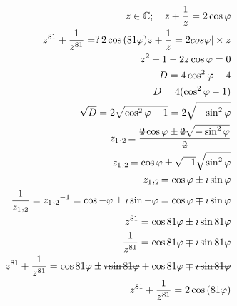 \documentclass{article}
\newcommand{\stkout}[1]{\ifmmode\text{\sout{\ensuremath{#1}}}\else\sout{#1}\fi}
\begin{document}
    \begin{align*}
        z \in \mathbb{C};\quad z + \frac{1}{z} = 2\cos\varphi\\
        z ^ {81} + \frac{1}{z ^ {81}} =?\, 2\cos{(81\varphi)}
        z + \frac{1}{z} = 2cos\varphi| \times z\\
        z^2 + 1 -2z\cos\varphi = 0\\
        D = 4\cos^2\varphi -4\\
        D = 4(\cos^2\varphi - 1)\\
        \sqrt{D} = 2\sqrt{\cos^2\varphi - 1} = 2\sqrt{-\sin^2\varphi}\\
        z_1,_2 = \frac{\stkout{2}\cos\varphi \pm \stkout{2}\sqrt{-\sin^2\varphi}}{\stkout{2}}\\
        z_1,_2 = \cos\varphi \pm \sqrt{-1}\sqrt{\sin^2\varphi}\\
        z_1,_2 = \cos\varphi \pm \imath\sin\varphi\\
        \frac{1}{z_1,_2} = {z_1,_2} ^{-1} = \cos{-\varphi} \pm \imath\sin{-\varphi} = \cos\varphi \mp \imath\sin\varphi\\
        z^{81} = \cos{81\varphi} \pm \imath\sin{81\varphi}\\
        \frac{1}{z^{81}} = \cos{81\varphi} \mp \imath\sin{81\varphi}\\
        z^{81} + \frac{1}{z^{81}} = \cos{81\varphi} \pm \stkout{\imath\sin{81\varphi}} + \cos{81\varphi} \mp \stkout{\imath\sin{81\varphi}}\\
        z ^ {81} + \frac{1}{z ^ {81}} = 2\cos{(81\varphi)}
    \end{align*}
\end{document}
